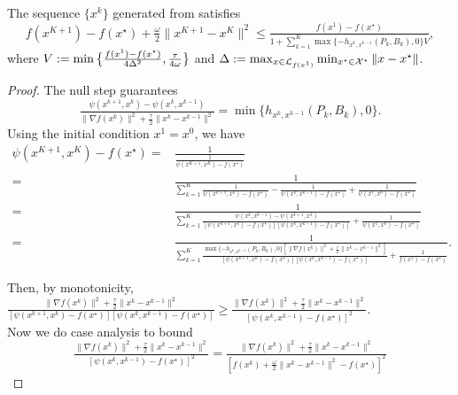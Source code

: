 \begin{lem} \label{lem:heavyball-conversion}
  The sequence $\{x^k\}$ generated from  satisfies
  \begin{equation} \label{eqn:potential-bound}
    f(x^{K+1}) - f(x^{\star}) + \tfrac{\omega}{2} \|x^{K+1} - x^K\|^2 \leq \tfrac{f (x^1) - f (x^{\star})}{1 + \sum_{k = 1}^K
    \max \{ - h_{x^k, x^{k - 1}} (P_k, B_k), 0 \} V},
  \end{equation}
  where $V := \min \big\{\tfrac{f (x^1) - f (x^{\star})}{4 \Delta^2}, \tfrac{\tau}{4 \omega} \big\}$ and $\Delta := \max_{x \in \mathcal{L}_{f(x^1)}} \min_{x^{\star} \in \mathcal{X}^{\star}} \| x - x^{\star} \|$.
\end{lem}

\begin{proof}
  The null step guarantees
\[ \tfrac{\psi (x^{k + 1}, x^k) - \psi (x^k, x^{k - 1})}{\| \nabla f
   (x^k) \|^2 + \frac{\tau}{2} \| x^k - x^{k - 1} \|^2} = \min \{ h_{x^k, x^{k
   - 1}} (P_k, B_k), 0 \}. \]
Using the initial condition $x^1 = x^0$, we have
\begin{align}
\psi (x^{K + 1}, x^K) - f (x^{\star})   ={} & \frac{1}{\frac{1}{\psi (x^{K + 1}, x^K) - f (x^{\star})}} \nonumber\\
  ={} & \frac{1}{\sum_{k = 1}^K \frac{1}{\psi (x^{k + 1}, x^k) - f
  (x^{\star})} - \frac{1}{\psi (x^k, x^{k - 1}) - f (x^{\star})} +
  \frac{1}{\psi (x^1, x^0) - f (x^{\star})}} \nonumber\\
  ={} & \frac{1}{\sum_{k = 1}^K \frac{\psi (x^k, x^{k - 1}) - \psi (x^{k +
  1}, x^k)}{[\psi (x^{k + 1}, x^k) - f (x^{\star})] [\psi (x^k, x^{k -
  1}) - f (x^{\star})]} + \frac{1}{\psi (x^1, x^0) - f (x^{\star})}}
  \nonumber\\
  ={} & \frac{1}{\sum_{k = 1}^K \frac{\max \{ - h_{x^k, x^{k - 1}} (P_k,
  B_k), 0 \} [ \| \nabla f (x^k) \|^2 + \frac{\tau}{2} \| x^k - x^{k
  - 1} \|^2 ]}{[\psi (x^{k + 1}, x^k) - f (x^{\star})] [\psi (x^k,
  x^{k - 1}) - f (x^{\star})]} + \frac{1}{f (x^1) - f (x^{\star})}} \label{eqn:proof-4-2-1}.
\end{align}

Then, by monotonicity, $\tfrac{\| \nabla f (x^k) \|^2 + \frac{\tau}{2} \| x^k
- x^{k - 1} \|^2}{[\psi (x^{k + 1}, x^k) - f (x^{\star})] [\psi (x^k,
x^{k - 1}) - f (x^{\star})]} \geq \tfrac{\| \nabla f (x^k) \|^2 +
\frac{\tau}{2} \| x^k - x^{k - 1} \|^2}{[\psi (x^k, x^{k - 1}) - f
(x^{\star})]^2}$.\\

Now we do case analysis to bound
\[ \tfrac{\| \nabla f (x^k) \|^2 + \frac{\tau}{2} \| x^k - x^{k - 1}
   \|^2}{[\psi (x^k, x^{k - 1}) - f (x^{\star})]^2} = \tfrac{\| \nabla f
   (x^k) \|^2 + \frac{\tau}{2} \| x^k - x^{k - 1} \|^2}{[ f (x^k) +
   \frac{\omega}{2} \| x^k - x^{k - 1} \|^2 - f (x^{\star}) ]^2} \]

\end{proof}
